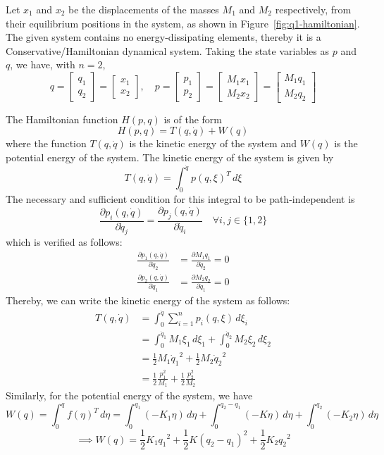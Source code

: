 \clearpage
Let \(x_1\) and \(x_2\) be the displacements of the masses \(M_1\) and \(M_2\) respectively, from their equilibrium positions in the system, as shown in Figure~\ref{fig:q1-hamiltonian}.
The given system contains no energy-dissipating elements, thereby it is a Conservative/Hamiltonian dynamical system.
Taking the state variables as \(p\) and \(q\), we have, with \(n=2\),
\[
    q = \begin{bmatrix} q_1 \\ q_2 \end{bmatrix} = \begin{bmatrix} x_1 \\ x_2 \end{bmatrix},
    \quad
    p = \begin{bmatrix} p_1 \\ p_2 \end{bmatrix} = \begin{bmatrix} M_1 x_1 \\ M_2 x_2 \end{bmatrix} = \begin{bmatrix} M_1 q_1 \\ M_2 q_2 \end{bmatrix}
\]

The Hamiltonian function \(H(p,q)\) is of the form
\[
    H(p,q) = T(q, \dot q) + W(q)
    \tag{1.1}
\]
where the function \(T(q, \dot q)\) is the kinetic energy of the system and \(W(q)\) is the potential energy of the system.
The kinetic energy of the system is given by
\[
    T(q, \dot q) = \int_{0}^{\dot q} {p(q, \xi)}^T \, d\xi
\]
The necessary and sufficient condition for this integral to be path-independent is
\[
    \frac{\partial p_i(q, \dot q)}{\partial \dot q_j} = \frac{\partial p_j(q, \dot q)}{\partial \dot q_i} \quad \forall i,j \in \{1,2\}
\]
which is verified as follows:
\begin{align*}
    \frac{\partial p_1(q, \dot q)}{\partial \dot q_2}
     & =
    \frac{\partial M_1 q_1}{\partial \dot q_2} = 0 \\
    \frac{\partial p_2(q, \dot q)}{\partial \dot q_1}
     & =
    \frac{\partial M_2 q_2}{\partial \dot q_1} = 0
\end{align*}
Thereby, we can write the kinetic energy of the system as follows:
\begin{align*}
    T(q, \dot q)
     & =
    \int_{0}^{\dot q} \sum_{i=1}^{n} p_i(q, \xi) \, d\xi_i
    \\ & =
    \int_{0}^{\dot q_1} M_1 \xi_1 \, d\xi_1
    + \int_{0}^{\dot q_2} M_2 \xi_2 \, d\xi_2
    \\ & =
    \frac{1}{2} M_1 {\dot q_1}^2
    + \frac{1}{2} M_2 {\dot q_2}^2
    \\ & =
    \frac{1}{2} \frac{p_1^2}{M_1}
    + \frac{1}{2} \frac{p_2^2}{M_2}
    \tag{1.2}
\end{align*}
Similarly, for the potential energy of the system, we have
\[
    W(q) = \int_{0}^{q} {f(\eta)}^T \, d\eta
    = \int_{0}^{q_1} (-K_1 \eta)\, d\eta
    + \int_{0}^{q_2 - q_1} (-K \eta)\, d\eta
    + \int_{0}^{q_2} (-K_2 \eta)\, d\eta
\]
\[
    \implies
    W(q) = \frac{1}{2} K_1 {q_1}^2 + \frac{1}{2} K {(q_2 - q_1)}^2 + \frac{1}{2} K_2 {q_2}^2
    \tag{1.3}
\]


